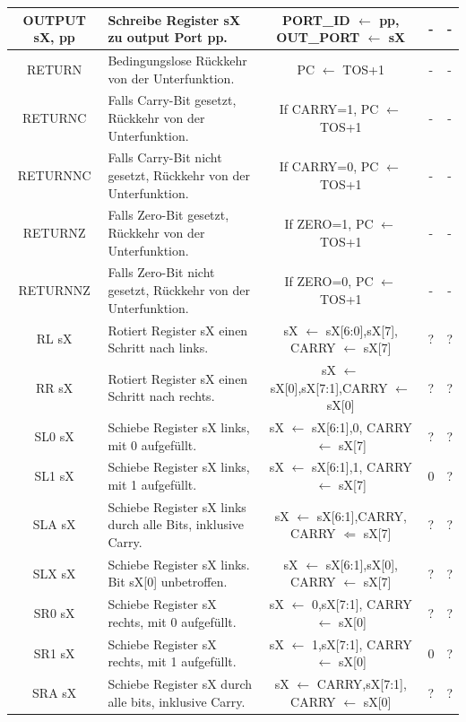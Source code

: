\documentclass{scrartcl}
\begin{document}
\begin{longtable}{||c|p{4cm}|c|c|c||}
         OUTPUT sX, pp & Schreibe Register sX zu output Port pp. &PORT\_ID $\leftarrow$ pp, OUT\_PORT $\leftarrow$ sX & - & -  \\ \hline
         RETURN & Bedingungslose Rückkehr von der Unterfunktion. & PC $\leftarrow$ TOS+1 & - & -  \\ \hline
         RETURNC & Falls Carry-Bit gesetzt, Rückkehr von der Unterfunktion. & If CARRY=1, PC $\leftarrow$ TOS+1 & - & - \\ \hline
         RETURNNC & Falls Carry-Bit nicht gesetzt, Rückkehr von der Unterfunktion. & If CARRY=0, PC $\leftarrow$ TOS+1 & - & - \\ \hline
         RETURNZ & Falls Zero-Bit gesetzt, Rückkehr von der Unterfunktion.& If ZERO=1, PC $\leftarrow$ TOS+1 & - & - \\ \hline
         RETURNNZ & Falls Zero-Bit nicht gesetzt, Rückkehr von der Unterfunktion. & If ZERO=0, PC $\leftarrow$ TOS+1 & - & - \\ \hline
         RL sX & Rotiert Register sX einen Schritt nach links. &sX $\leftarrow$ {sX[6:0],sX[7]}, CARRY $\leftarrow$ sX[7] & ? & ?  \\ \hline
         RR sX & Rotiert Register sX einen Schritt nach rechts. &sX $\leftarrow$ {sX[0],sX[7:1]},CARRY $\leftarrow$ sX[0] & ? & ?  \\ \hline
         SL0 sX & Schiebe Register sX links, mit 0 aufgefüllt. &sX $\leftarrow$ {sX[6:1],0}, CARRY $\leftarrow$ sX[7] & ? & ?  \\ \hline
         SL1 sX & Schiebe Register sX links, mit 1 aufgefüllt. &sX $\leftarrow$ {sX[6:1],1}, CARRY $\leftarrow$ sX[7]  & 0 & ?  \\ \hline
         SLA sX & Schiebe Register sX links durch alle Bits, inklusive Carry. &sX $\leftarrow$ {sX[6:1],CARRY}, CARRY $\Leftarrow$ sX[7]  & ? & ?  \\ \hline
         SLX sX & Schiebe Register sX links. Bit sX[0] unbetroffen. &sX $\leftarrow$ {sX[6:1],sX[0]}, CARRY $\leftarrow$ sX[7]  & ? & ?  \\ \hline
         SR0 sX & Schiebe Register sX rechts, mit 0 aufgefüllt. &sX $\leftarrow$ {0,sX[7:1]}, CARRY $\leftarrow$ sX[0]& ? & ?  \\ \hline
         SR1 sX & Schiebe Register sX rechts, mit 1 aufgefüllt. &sX $\leftarrow$ {1,sX[7:1]}, CARRY $\leftarrow$ sX[0] & 0 & ?  \\ \hline
         SRA sX & Schiebe Register sX durch alle bits, inklusive Carry. &sX $\leftarrow$ {CARRY,sX[7:1]}, CARRY $\leftarrow$ sX[0] & ? & ?  \\ \hline

\end{longtable}
\end{document}
